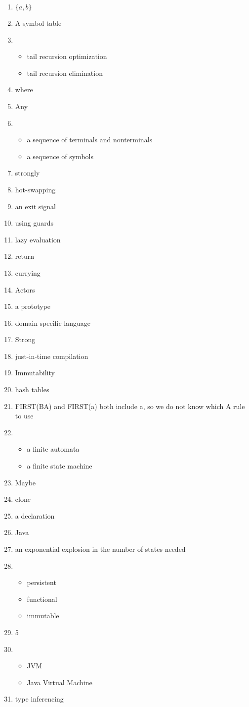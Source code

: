 \documentclass{exam}
\begin{document}
\begin{enumerate}
\begin{itemize}
\item call-by-reference
\item pass-by-reference
\end{itemize}
\item $\{a,b\}$
\item A symbol table
\item \begin{itemize}
\item tail recursion optimization
\item tail recursion elimination
\end{itemize}
\item where
\item Any
\item \begin{itemize}
\item a sequence of terminals and nonterminals
\item a sequence of symbols
\end{itemize}
\item strongly
\item hot-swapping
\item an exit signal
\item using guards
\item lazy evaluation
\item return
\item currying
\item Actors
\item a prototype
\item domain specific language
\item Strong
\item just-in-time compilation
\item Immutability
\item hash tables
\item FIRST(BA) and FIRST(a) both include a, so we do not know which A rule to use
\item \begin{itemize}
\item a finite automata
\item a finite state machine
\end{itemize}
\item Maybe
\item clone
\item a declaration
\item Java
\item an exponential explosion in the number of states needed
\item \begin{itemize}
\item persistent
\item functional
\item immutable
\end{itemize}
\item 5
\item \begin{itemize}
\item JVM
\item Java Virtual Machine
\end{itemize}
\item type inferencing
\end{enumerate}
\end{document}
